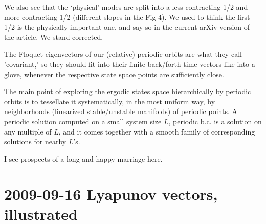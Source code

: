 \begin{description}
We also see
that the `physical' modes are split into a less contracting 1/2
and more contracting 1/2 (different slopes in the Fig 4). We
used to think the first 1/2 is the physically important one,
and say so in the current arXiv version of the article.
We stand corrected.

The Floquet eigenvectors of our (relative) periodic orbits are
what they call 'covariant,' so they should fit into their finite back/forth
time vectors like into a glove, whenever the respective state space
points are sufficiently close.

The main point of exploring the ergodic states space hierarchically
by periodic orbits is to tessellate it systematically, in the most
uniform way, by neighborhoods (linearized stable/unstable manifolds)
of periodic points. A periodic solution computed on a small system
size $L$, periodic b.c. is a solution on any multiple of $L$, and it comes
together with a smooth family of corresponding solutions for nearby
$L$'s.

I see prospects of a long and happy marriage here.

\end{description}

\section{2009-09-16 Lyapunov vectors, illustrated}

